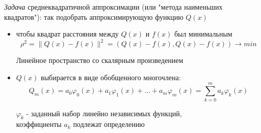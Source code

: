 \documentclass[a4paper,11pt]{article}
\begin{document}
\textit{Задача} среднеквадратичной аппроксимации (или "метода наименьших квадратов"): так подобрать аппроксимирующую функцию $Q(x)$
\begin{itemize}
  \item чтобы квадрат расстояния между $Q(x)$ и $f(x)$ был минимальным
    \begin{equation*}
      \rho^2 = \parallel Q(x)-f(x) \parallel ^2 = (Q(x)-f(x), Q(x)-f(x)) \rightarrow min
    \end{equation*}
    \begin{center}
      \small{Линейное пространство со скалярным произведением}
    \end{center}
  \item $Q(x)$ выбирается в виде обобщенного многочлена:
    \begin{equation}
      Q_m(x) = a_0\varphi_0(x) + a_1\varphi_1(x) +\dots+ a_m\varphi_m(x) = \sum_{k=0}^{m}a_k\varphi_k(x)
    \end{equation}
    \begin{center}
      \small{{$\varphi_k$} - заданный набор линейно независимых функций, \\
      коэффициенты $a_k$ подлежат определению}
    \end{center}
\end{itemize}
\end{document}
